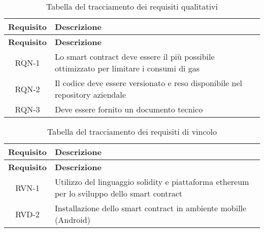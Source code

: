 \begin{center}
\begin{longtable}{| c | p{30em} |}
		\end{longtable}
	\end{center}

\begin{center}
	\begin{longtable}{| c | p{30em} |}
		\caption{Tabella del tracciamento dei requisiti qualitativi}
		\label{tab:requisiti-qualitativi}\\
		\hline
		\textbf{Requisito} & \centering\textbf{Descrizione}\\
		\endfirsthead
		\hline
		\textbf{Requisito} & \centering\textbf{Descrizione}\\
		\endhead
		\endfoot
		
		\hline
		RQN-1    & Lo smart contract deve essere il più possibile ottimizzato per limitare i consumi di gas \\
		\hline
		RQN-2    & Il codice deve essere versionato e reso disponibile nel repository aziendale \\
		\hline
		RQN-3    & Deve essere fornito un documento tecnico \\
		\hline
	

	\end{longtable}
\end{center}

\begin{center}
	\begin{longtable}{| c | p{30em} |}
		\caption{Tabella del tracciamento dei requisiti di vincolo}
		\label{tab:requisiti-vincolo}\\
		\hline
		\textbf{Requisito} & \centering\textbf{Descrizione}\\
		\endfirsthead
		\hline
		\textbf{Requisito} & \centering\textbf{Descrizione}\\
		\endhead
		\endfoot
		
		\hline
		RVN-1    & Utilizzo del linguaggio solidity e piattaforma ethereum per lo sviluppo dello smart contract  \\
		\hline
		RVD-2    & Installazione dello smart contract in ambiente mobille (Android) \\
		\hline
	\end{longtable}
\end{center}
